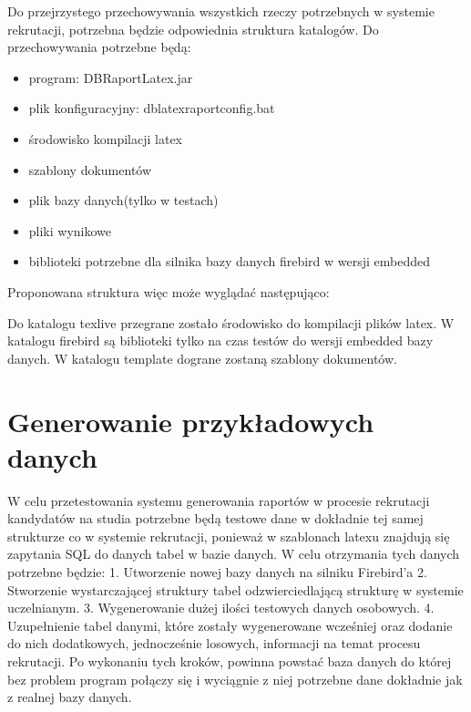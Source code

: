 Do przejrzystego przechowywania wszystkich rzeczy potrzebnych w systemie rekrutacji, potrzebna będzie odpowiednia struktura katalogów. Do przechowywania potrzebne będą: \\
\begin{itemize}
\item program: DBRaportLatex.jar
\item plik konfiguracyjny: dblatexraportconfig.bat
\item środowisko kompilacji latex
\item szablony dokumentów 
\item plik bazy danych(tylko w testach)
\item pliki wynikowe
\item biblioteki potrzebne dla silnika bazy danych firebird w wersji embedded \\
\end{itemize}

Proponowana struktura więc może wyglądać następująco:

\vspace{5mm}
Do katalogu texlive przegrane zostało środowisko do kompilacji plików latex. W katalogu firebird są biblioteki tylko na czas testów do wersji embedded bazy danych. W katalogu template dograne zostaną szablony dokumentów.


\section{ Generowanie przykładowych danych}

W celu przetestowania systemu generowania raportów w procesie rekrutacji kandydatów na studia potrzebne będą testowe dane w dokładnie tej samej strukturze co w systemie rekrutacji, ponieważ w szablonach latexu znajdują się zapytania SQL do danych tabel w bazie danych. 
W celu otrzymania tych danych potrzebne będzie:
1.	Utworzenie nowej bazy danych na silniku Firebird’a 
2.	Stworzenie wystarczającej struktury tabel odzwierciedlającą strukturę w systemie uczelnianym.
3.	Wygenerowanie dużej ilości testowych danych osobowych.
4.	Uzupełnienie tabel danymi, które zostały wygenerowane wcześniej oraz dodanie do nich dodatkowych, jednocześnie losowych, informacji na temat procesu rekrutacji.
Po wykonaniu tych kroków, powinna powstać baza danych do której bez problem program połączy się i wyciągnie z niej potrzebne dane dokładnie jak z realnej bazy danych.

